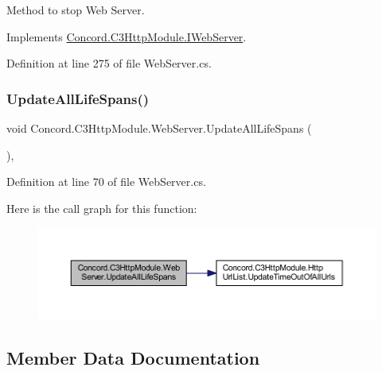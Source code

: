 Method to stop Web Server. 



Implements \mbox{\hyperlink{interface_concord_1_1_c3_http_module_1_1_i_web_server_a800e9a97640440f79e356cf3fa3ddbf8}{Concord.\+C3\+Http\+Module.\+I\+Web\+Server}}.



Definition at line 275 of file Web\+Server.\+cs.

\mbox{\label{class_concord_1_1_c3_http_module_1_1_web_server_afd9ec2b5e4835ee1e5b59cd248e9c706}} 
\subsubsection{\texorpdfstring{UpdateAllLifeSpans()}{UpdateAllLifeSpans()}}
{\footnotesize\ttfamily void Concord.\+C3\+Http\+Module.\+Web\+Server.\+Update\+All\+Life\+Spans (\begin{DoxyParamCaption}{ }\end{DoxyParamCaption})\hspace{0.3cm}{\ttfamily [inline]}, {\ttfamily [private]}}



Definition at line 70 of file Web\+Server.\+cs.

Here is the call graph for this function\+:
\nopagebreak
\begin{figure}[H]
\begin{center}
\leavevmode
\includegraphics[width=350pt]{class_concord_1_1_c3_http_module_1_1_web_server_afd9ec2b5e4835ee1e5b59cd248e9c706_cgraph}
\end{center}
\end{figure}


\subsection{Member Data Documentation}
\mbox{\label{class_concord_1_1_c3_http_module_1_1_web_server_aaea2f407ddadea5271a7ba77017a43d0}} 
